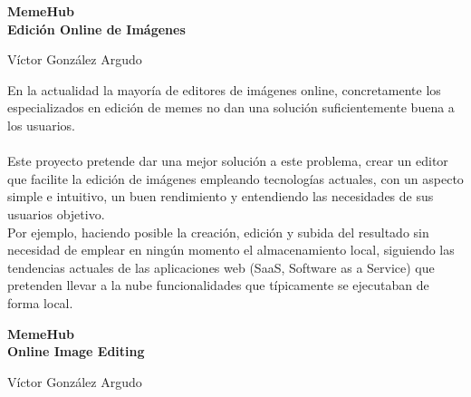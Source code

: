 \thispagestyle{empty}

\begin{center}
{\large\bfseries MemeHub \\ Edición Online de Imágenes }\\
\end{center}
\begin{center}
Víctor González Argudo\\
\end{center}


\vspace{0.5cm}
\vspace{0.7cm}

	En la actualidad la mayoría de editores de imágenes online, concretamente los especializados en
	edición de memes no dan una solución suficientemente buena a los usuarios.
	\\\\
	Este proyecto pretende dar una mejor solución a este problema, crear un editor que facilite
	la edición de imágenes empleando tecnologías actuales, con un aspecto simple e intuitivo, un buen 
	rendimiento y entendiendo las necesidades de sus usuarios objetivo.
	\\
	Por ejemplo, haciendo posible la creación, edición y subida del resultado sin necesidad de 
	emplear en ningún momento el almacenamiento local, siguiendo las tendencias actuales de 
	las aplicaciones web (SaaS, Software as a Service) que pretenden llevar a la nube funcionalidades
	que típicamente se ejecutaban de forma local.

\cleardoublepage

\begin{center}
	{\large\bfseries MemeHub \\ Online Image Editing}\\
\end{center}
\begin{center}
	Víctor González Argudo\\
\end{center}
\vspace{0.5cm}
\vspace{0.7cm}

